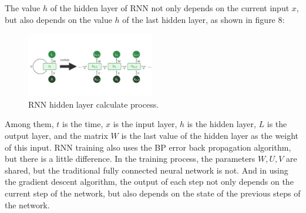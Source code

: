 \documentclass{ieeeojies}
\begin{document}
The value $h$ of the hidden layer of RNN not only depends on the current input $x$, but also depends on the value $h$ of the last hidden layer, as shown in figure 8:
\begin{figure} [H]
    \centering
    \includegraphics[width=0.5\textwidth]{bibliography/Figure/What-is-Recurrent-Neural-Network.jpg}
    \caption{RNN hidden layer calculate process.}
    \label{fig:rnn-hidden-layer}
\end{figure}
Among them, $t$ is the time, $x$ is the input layer, $h$ is the hidden layer, $L$ is the output layer, and the matrix $W$ is the last value of the hidden layer as the weight of this input. RNN training also uses the BP error back propagation algorithm, but there is a little difference. In the training process, the parameters $W, U, V$ are shared, but the traditional fully connected neural network is not. And in using the gradient descent algorithm, the output of each step not only depends on the current step of the network, but also depends on the state of the previous steps of the network.
\end{document}
